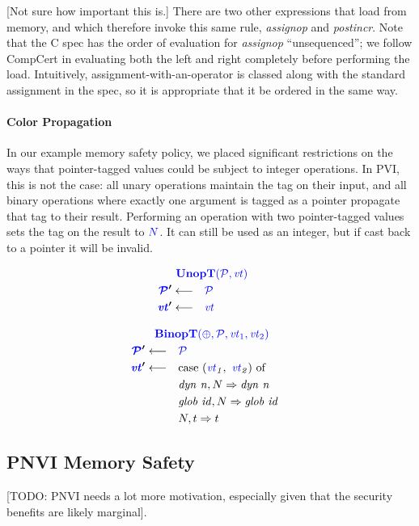 \documentclass[acmsmall,review,anonymous]{acmart}\settopmatter{printfolios=true,printccs=false,printacmref=false}
\begin{document}
[Not sure how important this is.]
There are two other expressions that load from memory, and which therefore invoke
this same rule, {\it assignop} and {\it postincr}. Note that the C spec has the order
of evaluation for {\it assignop} ``unsequenced''; we follow CompCert \cite{Leroy09:CompCert}
in evaluating both the left
and right completely before performing the load. Intuitively, assignment-with-an-operator is
classed along with the standard assignment in the spec, so it is appropriate that it be ordered
in the same way.

\paragraph*{Color Propagation}

In our example memory safety policy, we placed significant restrictions on the
ways that pointer-tagged values could be subject to integer operations.
In PVI, this is not the case: all unary operations maintain the tag on their
input, and all binary operations where exactly one argument is tagged as a pointer
propagate that tag to their result. Performing an operation with two pointer-tagged values
sets the tag on the result to \({\color{blue} N}\). It can still
be used as an integer, but if cast back to a pointer it will be invalid.
            
\begin{minipage}[t]{.49\textwidth}            
  \[\begin{aligned}
  \truledef{\unopt}
  \settag{\PCT'}{\PCT}
  \settag{\vt'}{\vt}
  \end{aligned}\]
\end{minipage}
\begin{minipage}[t]{.49\textwidth}           
  \[\begin{aligned}
  \truledef{\binopt}
  \settag{\PCT'}{\PCT}
  \settag{\vt'}{\caseof{(\vt_1,~ \vt_2)}}
  \caseentry{\mathit{dyn ~ n},N}{\mathit{dyn ~ n}} \\
  \caseentry{\mathit{glob ~ id},N}{\mathit{glob ~ id}} \\
  \caseentry{N,t}{t} \\
  \end{aligned}\]
\end{minipage}

\subsection{PNVI Memory Safety}
\label{sec:PNVI}

[TODO: PNVI needs a lot more motivation, especially given that the security benefits are
  likely marginal].
\end{document}

